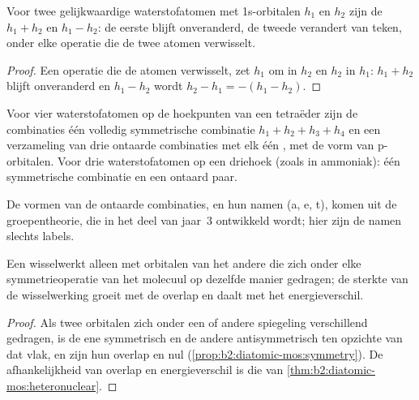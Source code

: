 \begin{proposition}\label{prop:b2:fragment-orbitals:h2-pair}
Voor twee gelijkwaardige waterstofatomen met 1s-orbitalen $h_1$ en $h_2$ zijn de
 $h_1 + h_2$ en $h_1 - h_2$: de eerste blijft
onveranderd, de tweede verandert van teken, onder elke operatie die de twee
atomen verwisselt.
\end{proposition}

\begin{proof}
Een operatie die de atomen verwisselt, zet $h_1$ om in $h_2$ en $h_2$ in
$h_1$: $h_1 + h_2$ blijft onveranderd en $h_1 - h_2$ wordt $h_2 - h_1 = -(h_1 - h_2)$.
\end{proof}

\begin{proposition}\label{prop:b2:fragment-orbitals:h4}
Voor vier waterstofatomen op de hoekpunten van een tetraëder zijn de combinaties één
volledig symmetrische combinatie $h_1 + h_2 + h_3 + h_4$ en een verzameling van drie ontaarde
combinaties met elk één , met de vorm van p-orbitalen. Voor drie
waterstofatomen op een driehoek (zoals in ammoniak): één symmetrische combinatie en een
ontaard paar.
\end{proposition}

\admitted

De vormen van de ontaarde combinaties, en hun namen (a, e, t), komen uit de
groepentheorie, die in het deel van jaar~3 ontwikkeld wordt; hier zijn de namen slechts labels.

\begin{proposition}\label{prop:b2:fragment-orbitals:interaction-rules}
Een  wisselwerkt alleen met orbitalen van het andere  die
zich onder elke symmetrieoperatie van het molecuul op dezelfde manier gedragen; de
sterkte van de wisselwerking groeit met de overlap en daalt met het
energieverschil.
\end{proposition}

\begin{proof}
Als twee orbitalen zich onder een of andere spiegeling verschillend gedragen, is de ene symmetrisch en
de andere antisymmetrisch ten opzichte van dat vlak, en zijn hun overlap en
 nul (\cref{prop:b2:diatomic-mos:symmetry}). De afhankelijkheid van
overlap en energieverschil is die van \cref{thm:b2:diatomic-mos:heteronuclear}.
\end{proof}

